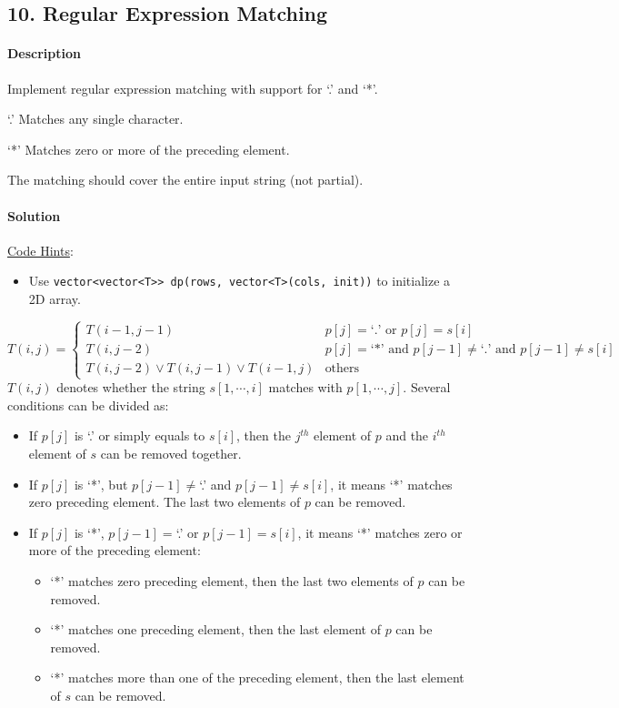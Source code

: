 \subsection{10. Regular Expression Matching}

\paragraph{Description}

Implement regular expression matching with support for `.' and `*'.

`.' Matches any single character.

`*' Matches zero or more of the preceding element.

The matching should cover the entire input string (not partial).

\paragraph{Solution}

\underline{Code Hints}:
\begin{itemize}
    \item Use \texttt{vector<vector<T>> dp(rows, vector<T>(cols, init))} to initialize a 2D array.
\end{itemize}

\begin{equation*}
T(i,j)=\begin{cases}
T(i-1,j-1) & p[j]=\text{`.' or }p[j]=s[i]\\
T(i,j-2) & p[j]=\text{`*' and }p[j-1]\neq\text{`.' and }p[j-1]\neq s[i]\\
T(i,j-2)\vee T(i,j-1)\vee T(i-1,j) & \text{others}
\end{cases}
\end{equation*}
$T(i,j)$ denotes whether the string $s[1,\cdots,i]$ matches with $p[1,\cdots,j]$. Several conditions can be divided as:
\begin{itemize}
    \item If $p[j]$ is `.' or simply equals to $s[i]$, then the $j^{th}$ element of $p$ and the $i^{th}$ element of $s$ can be removed together.
    \item If $p[j]$ is `*', but $p[j-1]\neq$`.' and $p[j-1]\neq s[i]$, it means `*' matches zero preceding element. The last two elements of $p$ can be removed.
    \item If $p[j]$ is `*', $p[j-1]=$`.' or $p[j-1]=s[i]$, it means `*' matches zero or more of the preceding element:
    \begin{itemize}
        \item `*' matches zero preceding element, then the last two elements of $p$ can be removed.
        \item `*' matches one preceding element, then the last element of $p$ can be removed.
        \item `*' matches more than one of the preceding element, then the last element of $s$ can be removed.
    \end{itemize}
\end{itemize}


